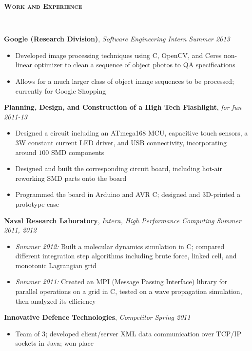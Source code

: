 \documentclass{article}
\newenvironment{changemargin}[2]{%
  \begin{list}{}{%
    \setlength{\topsep}{0pt}%
    \setlength{\leftmargin}{#1}%
    \setlength{\rightmargin}{#2}%
    \setlength{\listparindent}{\parindent}%
    \setlength{\itemindent}{\parindent}%
    \setlength{\parsep}{\parskip}%
  }%
  \item[]}{\end{list}
}
\newcommand{\lineover}{
	\begin{changemargin}{-0.05in}{-0.05in}
		\vspace*{-8pt}
		\hrulefill \\
		\vspace*{-2pt}
	\end{changemargin}
}
\newcommand{\header}[1]{
	\begin{changemargin}{-0.5in}{-0.5in}
		{\large \textbf{\scshape{#1}}}\\
  	\lineover
	\end{changemargin}
}
\newenvironment{body} {
	\vspace*{-16pt}
	\begin{changemargin}{-0.25in}{-0.5in}
  }	
	{\end{changemargin}
}
\newcommand{\CC}{C\nolinebreak\hspace{-.05em}\raisebox{.4ex}{\tiny\bf +}\nolinebreak\hspace{-.10em}\raisebox{.4ex}{\tiny\bf +}}
\begin{document}
\header{Work and Experience}

\begin{body}
	\vspace{14pt}
	\textbf{Google (Research Division)}, \emph{Software Engineering Intern} \hfill \emph{Summer 2013}\\
	\vspace*{-4pt}
	\begin{itemize}
		\item Developed image processing techniques using \CC, OpenCV, and Ceres non-linear optimizer to clean a sequence of object photos to QA specifications
		\item Allows for a much larger class of object image sequences to be processed; currently for Google Shopping
	\end{itemize}
	
	\medskip
	
	\textbf{Planning, Design, and Construction of a High Tech Flashlight}, \emph{for fun} \hfill \emph{2011-13}\\
	\vspace*{-4pt}
	\begin{itemize}
		\item Designed a circuit including an ATmega168 MCU, capacitive touch sensors, a 3W constant current LED driver, and USB connectivity, incorporating around $100$ SMD components
		\item Designed and built the corresponding circuit board, including hot-air reworking SMD parts onto the board
		\item Programmed the board in Arduino and AVR C; designed and 3D-printed a prototype case
	\end{itemize}

	\medskip

	\textbf{Naval Research Laboratory}, \emph{Intern, High Performance Computing} \hfill \emph{Summer 2011, 2012}\\
	\vspace*{-4pt}
	\begin{itemize}
		\item \emph{Summer 2012:} Built a molecular dynamics simulation in C; compared different integration step algorithms including brute force, linked cell, and monotonic Lagrangian grid
		\item \emph{Summer 2011:} Created an MPI (Message Passing Interface) library for parallel operations on a grid in \CC, tested on a wave propagation simulation, then analyzed its efficiency
	\end{itemize}

	\medskip
	
	\textbf{Innovative Defence Technologies}, \emph{Competitor} \hfill \emph{Spring 2011}\\
	\vspace*{-4pt}
	\begin{itemize}
		\item Team of 3; developed client/server XML data communication over TCP/IP sockets in Java; won  place
	\end{itemize}
\end{body}
\end{document}

